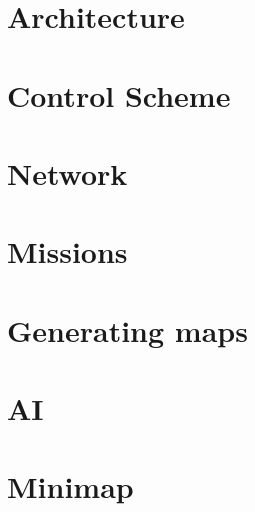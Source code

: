 \chapter{Architecture}


\chapter{Control Scheme}



\chapter{Network}


\chapter{Missions}\label{chapter:modules:missions}


\chapter{Generating maps}


\chapter{AI}


\chapter{Minimap}

